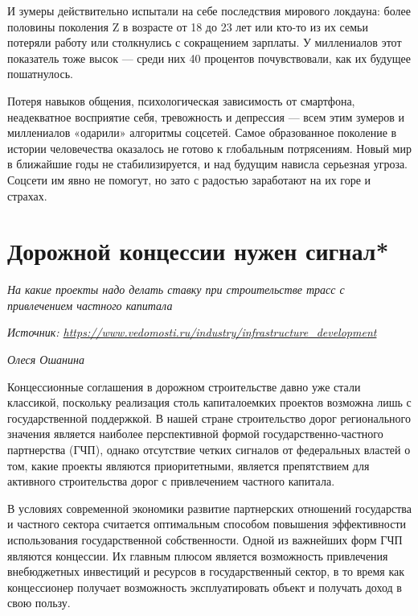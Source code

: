 И зумеры действительно испытали на себе последствия мирового локдауна: более половины поколения Z в возрасте от 18 до 23 лет или кто-то из их семьи потеряли работу или столкнулись с сокращением зарплаты. У миллениалов этот показатель тоже высок — среди них 40 процентов почувствовали, как их будущее пошатнулось.

Потеря навыков общения, психологическая зависимость от смартфона, неадекватное восприятие себя, тревожность и депрессия — всем этим зумеров и миллениалов «одарили» алгоритмы соцсетей. Самое образованное поколение в истории человечества оказалось не готово к глобальным потрясениям. Новый мир в ближайшие годы не стабилизируется, и над будущим нависла серьезная угроза. Соцсети им явно не помогут, но зато с радостью заработают на их горе и страхах.

\clearpage


\section{Дорожной концессии нужен сигнал*}

\textit{На какие проекты надо делать ставку при строительстве трасс с привлечением частного капитала}

\textit{Источник: \url{https://www.vedomosti.ru/industry/infrastructure_development}}

\textit{Олеся Ошанина}

Концессионные соглашения в дорожном строительстве давно уже стали классикой, поскольку реализация столь капиталоемких проектов возможна лишь с государственной поддержкой. В нашей стране строительство дорог регионального значения является наиболее перспективной формой государственно-частного партнерства (ГЧП), однако отсутствие четких сигналов от федеральных властей о том, какие проекты являются приоритетными, является препятствием для активного строительства дорог с привлечением частного капитала.

В условиях современной экономики развитие партнерских отношений государства и частного сектора считается оптимальным способом повышения эффективности использования государственной собственности. Одной из важнейших форм ГЧП являются концессии. Их главным плюсом является возможность привлечения внебюджетных инвестиций и ресурсов в государственный сектор, в то время как концессионер получает возможность эксплуатировать объект и получать доход в свою пользу.

